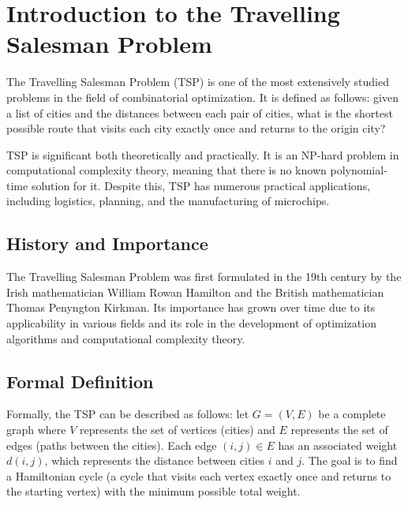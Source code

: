 \documentclass[a4paper]{article}
\begin{document}
\thispagestyle{empty}

\newpage
\renewcommand{\contentsname}{Table of Contents}
\tableofcontents
\newpage

\section{Introduction to the Travelling Salesman Problem}
The Travelling Salesman Problem (TSP) is one of the most extensively studied problems in the field of combinatorial optimization. It is defined as follows: given a list of cities and the distances between each pair of cities, what is the shortest possible route that visits each city exactly once and returns to the origin city?

TSP is significant both theoretically and practically. It is an NP-hard problem in computational complexity theory, meaning that there is no known polynomial-time solution for it. Despite this, TSP has numerous practical applications, including logistics, planning, and the manufacturing of microchips.

\subsection{History and Importance}
The Travelling Salesman Problem was first formulated in the 19th century by the Irish mathematician William Rowan Hamilton and the British mathematician Thomas Penyngton Kirkman. Its importance has grown over time due to its applicability in various fields and its role in the development of optimization algorithms and computational complexity theory.

\subsection{Formal Definition}
Formally, the TSP can be described as follows: let \( G = (V, E) \) be a complete graph where \( V \) represents the set of vertices (cities) and \( E \) represents the set of edges (paths between the cities). Each edge \( (i, j) \in E \) has an associated weight \( d(i, j) \), which represents the distance between cities \( i \) and \( j \). The goal is to find a Hamiltonian cycle (a cycle that visits each vertex exactly once and returns to the starting vertex) with the minimum possible total weight.
\end{document}

